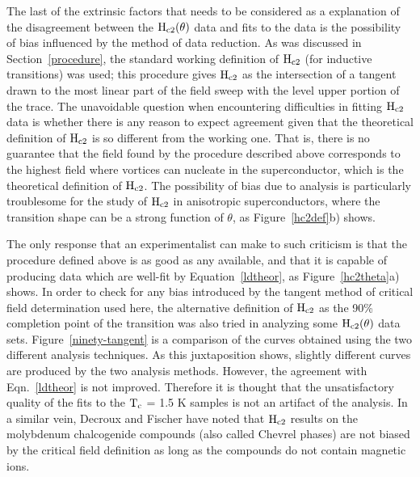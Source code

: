 	The last of the extrinsic factors that needs to  be considered as a
explanation of  the disagreement between the  $\rm H_{c2}(\theta)$ data and
fits to the data  is the  possibility  of bias influenced  by the method of
data reduction.  As was discussed  in Section~\ref{procedure}, the standard
working  definition of  $\rm H_{c2}$ (for  inductive transitions) was used;
this procedure gives $\rm H_{c2}$ as the intersection of a tangent drawn to
the most linear part of the field sweep with the level upper portion of the
trace.  The unavoidable question when encountering difficulties  in fitting
$\rm H_{c2}$ data is whether there is any reason  to expect agreement given
that the  theoretical definition  of $\rm H_{c2}$ is  so different from the
working one.  That is, there  is  no guarantee that the  field found by the
procedure described above  corresponds to the  highest field where vortices
can nucleate in the superconductor, which is  the theoretical definition of
$\rm  H_{c2}$.\cite{tinkham80,helfand66}  The possibility  of  bias  due to
analysis is particularly  troublesome   for  the study of $\rm  H_{c2}$  in
anisotropic  superconductors,  where the  transition shape can  be a strong
function of $\theta$, as Figure~\ref{hc2def}b) shows.

	The  only   response  that  an  experimentalist  can  make to  such
criticism is that the procedure defined above is as  good as any available,
and   that   it is   capable   of  producing data which    are  well-fit by
Equation~\ref{ldtheor}, as Figure~\ref{hc2theta}a) shows. In order to check
for   any bias  introduced  by    the  tangent method    of critical  field
determination used here, the alternative definition of  $\rm H_{c2}$ as the
90\% completion point  of the transition was  also tried  in analyzing some
$\rm    H_{c2}(\theta)$  data   sets.  Figure~\ref{ninety-tangent}    is  a
comparison  of   the curves obtained    using the  two  different  analysis
techniques.  As  this juxtaposition  shows,  slightly different  curves are
produced by   the   two  analysis methods.   However,   the agreement  with
Eqn.~\ref{ldtheor} is not  improved.   Therefore  it  is  thought that  the
unsatisfactory quality of the fits to the $\rm T_c$ = 1.5 K samples  is not
an artifact of the analysis.  In  a similar vein,  Decroux and Fischer have
noted  that $\rm H_{c2}$ results on  the  molybdenum chalcogenide compounds
(also called Chevrel phases) are not biased by the critical field definition
as long as the compounds do not contain magnetic ions.\cite{decroux82}

